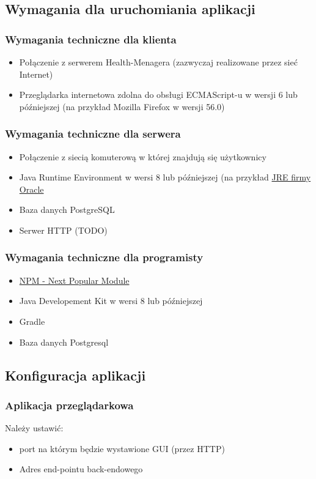 \documentclass[polish,12pt]{aghthesis}
\begin{document}
\subsection{Wymagania dla uruchomiania aplikacji}
\subsubsection{Wymagania techniczne dla klienta}
\begin{itemize}
  \item  Połączenie z serwerem Health-Menagera (zazwyczaj realizowane przez sieć Internet)
  \item Przeglądarka internetowa zdolna do obsługi ECMAScript-u w wersji 6 lub późniejszej (na przykład Mozilla Firefox w wersji 56.0)
\end{itemize}

\subsubsection{Wymagania techniczne dla serwera}
\begin{itemize}
    \item Połączenie z siecią komuterową w której znajdują się użytkownicy
    \item Java Runtime Environment w wersi 8 lub późniejszej (na przykład \href{https://www.java.com/pl/download/manual.jsp}{JRE firmy Oracle}
    \item Baza danych PostgreSQL
    \item Serwer HTTP (TODO)
\end{itemize}

\subsubsection{Wymagania techniczne dla programisty}
\begin{itemize}
    \item \href{https://www.npmjs.com/}{NPM - Next Popular Module}
    \item Java Developement Kit w wersi 8 lub późniejszej
    \item Gradle
    \item Baza danych Postgresql
\end{itemize}


\subsection{Konfiguracja aplikacji}
\subsubsection{Aplikacja przeglądarkowa}{Należy ustawić:
\begin{itemize}
    \item port na którym będzie wystawione GUI (przez HTTP)
    \item Adres end-pointu back-endowego
\end{itemize}}
\end{document}
